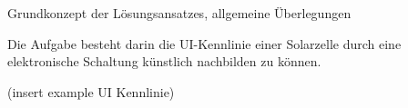 Grundkonzept der L\"osungsansatzes, allgemeine \"Uberlegungen

Die  Aufgabe  besteht  darin  die   UI-Kennlinie  einer  Solarzelle  durch  eine
elektronische Schaltung k\"unstlich nachbilden zu k\"onnen.

(insert example UI Kennlinie)


